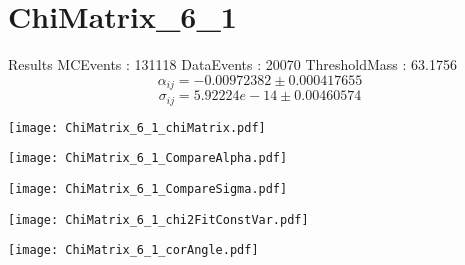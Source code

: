 \documentclass[a4paper,12pt]{article}
\begin{document}
\section{ChiMatrix\_6\_1}
\begin{minipage}{0.49\linewidth} Results \newline
MCEvents : 131118\newline
DataEvents : 20070 \newline
ThresholdMass : 63.1756\\
$$\alpha_{ij} = -0.00972382\pm 0.000417655$$
$$\sigma_{ij} = 5.92224e-14\pm 0.00460574$$
\end{minipage}\hfill
\begin{minipage}{0.49\linewidth} 
\texttt{[image: ChiMatrix\_6\_1\_chiMatrix.pdf]}\\
\end{minipage}
\hfill
\begin{minipage}{0.49\linewidth} 
\texttt{[image: ChiMatrix\_6\_1\_CompareAlpha.pdf]}\\
\end{minipage}
\hfill
\begin{minipage}{0.49\linewidth} 
\texttt{[image: ChiMatrix\_6\_1\_CompareSigma.pdf]}\\
\end{minipage}
\begin{minipage}{0.49\linewidth} 
\texttt{[image: ChiMatrix\_6\_1\_chi2FitConstVar.pdf]}\\
\end{minipage}
\hfill
\begin{minipage}{0.49\linewidth} 
\texttt{[image: ChiMatrix\_6\_1\_corAngle.pdf]}\\
\end{minipage}
\end{document}

